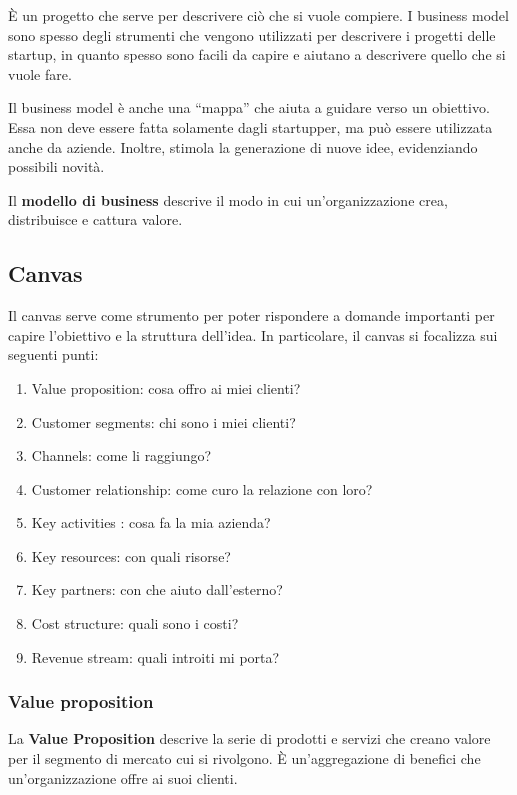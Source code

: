 È un progetto che serve per descrivere ciò che si vuole compiere. I business
model sono spesso degli strumenti che vengono utilizzati per descrivere i
progetti delle startup, in quanto spesso sono facili da capire e aiutano a
descrivere quello che si vuole fare.

Il business model è anche una ``mappa'' che aiuta a guidare verso un obiettivo.
Essa non deve essere fatta solamente dagli startupper, ma può essere utilizzata
anche da aziende. Inoltre, stimola la generazione di nuove idee, evidenziando
possibili novità.

\begin{definition}
Il \textbf{modello di business} descrive il modo in cui un'organizzazione crea,
distribuisce e cattura valore.
\end{definition}

\subsection{Canvas}

Il canvas serve come strumento per poter rispondere a domande importanti per
capire l'obiettivo e la struttura dell'idea. In particolare, il
canvas si focalizza sui seguenti punti:
\begin{enumerate}
 \item Value proposition: cosa offro ai miei clienti?
 \item Customer segments: chi sono i miei clienti?
 \item Channels: come li raggiungo?
 \item Customer relationship: come curo la relazione con loro?
 \item Key activities : cosa fa la mia azienda?
 \item Key resources: con quali risorse?
 \item Key partners: con che aiuto dall'esterno?
 \item Cost structure: quali sono i costi?
 \item Revenue stream: quali introiti mi porta?
\end{enumerate}

\subsubsection{Value proposition}

\begin{definition}
La \textbf{Value Proposition} descrive la serie di prodotti e servizi che
creano valore per il segmento di mercato cui si rivolgono. È un'aggregazione di
benefici che un'organizzazione offre ai suoi clienti.
\end{definition}

